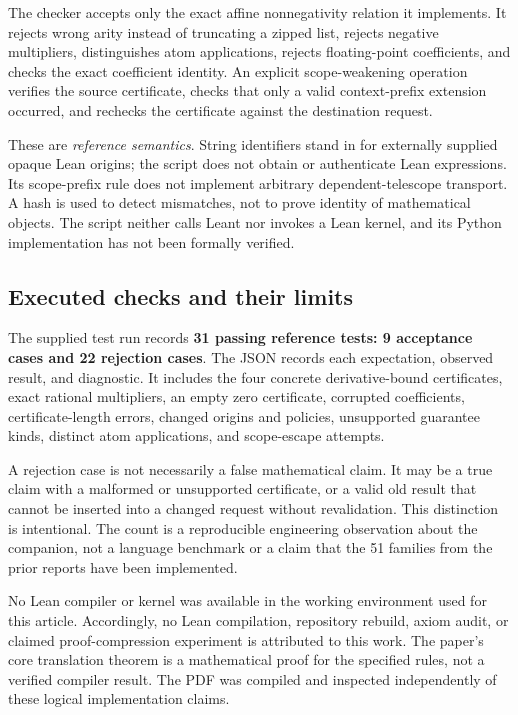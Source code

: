 \documentclass[11pt,a4paper]{article}
\theoremstyle{definition}
\theoremstyle{remark}
\begin{document}
The checker accepts only the exact affine nonnegativity relation it implements. It rejects wrong arity instead of truncating a zipped list, rejects negative multipliers, distinguishes atom applications, rejects floating-point coefficients, and checks the exact coefficient identity. An explicit scope-weakening operation verifies the source certificate, checks that only a valid context-prefix extension occurred, and rechecks the certificate against the destination request.

These are \emph{reference semantics}. String identifiers stand in for externally supplied opaque Lean origins; the script does not obtain or authenticate Lean expressions. Its scope-prefix rule does not implement arbitrary dependent-telescope transport. A hash is used to detect mismatches, not to prove identity of mathematical objects. The script neither calls Leant nor invokes a Lean kernel, and its Python implementation has not been formally verified.

\subsection{Executed checks and their limits}
The supplied test run records \textbf{31 passing reference tests: 9 acceptance cases and 22 rejection cases}. The JSON records each expectation, observed result, and diagnostic. It includes the four concrete derivative-bound certificates, exact rational multipliers, an empty zero certificate, corrupted coefficients, certificate-length errors, changed origins and policies, unsupported guarantee kinds, distinct atom applications, and scope-escape attempts.

A rejection case is not necessarily a false mathematical claim. It may be a true claim with a malformed or unsupported certificate, or a valid old result that cannot be inserted into a changed request without revalidation. This distinction is intentional. The count is a reproducible engineering observation about the companion, not a language benchmark or a claim that the 51 families from the prior reports have been implemented.

No Lean compiler or kernel was available in the working environment used for this article. Accordingly, no Lean compilation, repository rebuild, axiom audit, or claimed proof-compression experiment is attributed to this work. The paper's core translation theorem is a mathematical proof for the specified rules, not a verified compiler result. The PDF was compiled and inspected independently of these logical implementation claims.
\end{document}
